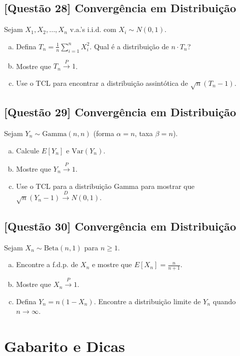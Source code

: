 \documentclass[12pt,a4paper]{article}
\begin{document}
\subsection*{[Questão 28] Convergência em Distribuição}

Sejam $X_1, X_2, \ldots, X_n$ v.a.'s i.i.d. com $X_i \sim N(0, 1)$.

\begin{enumerate}[(a)]
    \item Defina $T_n = \frac{1}{n}\sum_{i=1}^n X_i^2$. Qual é a distribuição de $n \cdot T_n$?
    \item Mostre que $T_n \xrightarrow{P} 1$.
    \item Use o TCL para encontrar a distribuição assintótica de $\sqrt{n}(T_n - 1)$.
\end{enumerate}

\subsection*{[Questão 29] Convergência em Distribuição}

Sejam $Y_n \sim \text{Gamma}(n, n)$ (forma $\alpha = n$, taxa $\beta = n$).

\begin{enumerate}[(a)]
    \item Calcule $E[Y_n]$ e $\text{Var}(Y_n)$.
    \item Mostre que $Y_n \xrightarrow{P} 1$.
    \item Use o TCL para a distribuição Gamma para mostrar que $\sqrt{n}(Y_n - 1) \xrightarrow{D} N(0, 1)$.
\end{enumerate}

\subsection*{[Questão 30] Convergência em Distribuição}

Sejam $X_n \sim \text{Beta}(n, 1)$ para $n \geq 1$.

\begin{enumerate}[(a)]
    \item Encontre a f.d.p. de $X_n$ e mostre que $E[X_n] = \frac{n}{n+1}$.
    \item Mostre que $X_n \xrightarrow{P} 1$.
    \item Defina $Y_n = n(1 - X_n)$. Encontre a distribuição limite de $Y_n$ quando $n \to \infty$.
\end{enumerate}

\section{Gabarito e Dicas}
\end{document}
